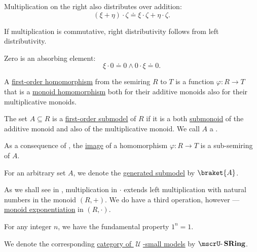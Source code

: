 \begin{definition}
\begin{thmenum}
\begin{thmenum}
       Multiplication on the right also distributes over addition:
      \begin{equation}\label{eq:def:semiring/right_distributivity}
        (\xi + \eta) \cdot \zeta \doteq \xi \cdot \zeta + \eta \cdot \zeta.
      \end{equation}

      If multiplication is commutative, right distributivity follows from left distributivity.

       Zero is an absorbing element:
      \begin{equation}\label{eq:def:semiring/absorption}
        \xi \cdot 0 \doteq 0 \wedge 0 \cdot \xi \doteq 0.
      \end{equation}
    \end{thmenum}

     A \hyperref[def:first_order_homomorphism]{first-order homomorphism} from the semiring \( R \) to \( T \) is a function \( \varphi: R \to T \) that is a \hyperref[def:monoid/homomorphism]{monoid homomorphism} both for their additive monoids also for their multiplicative monoids.

     The set \( A \subseteq R \) is a \hyperref[def:first_order_submodel]{first-order submodel} of \( R \) if it is a both \hyperref[def:monoid/submodel]{submonoid} of the additive monoid and also of the multiplicative monoid. We call \( A \) a .

    As a consequence of , the \hyperref[def:set_valued_map/image]{image} of a homomorphism \( \varphi: R \to T \) is a sub-semiring of \( A \).

     For an arbitrary set \( A \), we denote the \hyperref[def:first_order_generated_substructure]{generated submodel} by \( \braket{ A } \).

     As we shall see in , multiplication in \( \cdot \) extends left multiplication with natural numbers in the monoid \( (R, +) \). We do have a third operation, however --- \hyperref[def:monoid/exponentiation]{monoid exponentiation} in \( (R, \cdot) \).

    For any integer \( n \), we have the fundamental property \( 1^n = 1 \).

     We denote the corresponding \hyperref[def:category_of_small_first_order_models]{category of \( \mscrU \)-small models} by \( \ucat{SRing} \).


\end{thmenum}
\end{definition}
